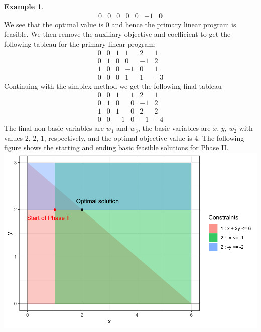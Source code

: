 \documentclass[
]{book}
\theoremstyle{definition}
\theoremstyle{definition}
\newtheorem{example}{Example}[chapter]
\theoremstyle{definition}
\theoremstyle{definition}
\theoremstyle{remark}
\begin{document}
\begin{example}
\begin{equation*}
\begin{array}{rrrrrr|r}
    0 & 0 & 0 & 0 & 0 & -1 & \mathbf{0} 
  \end{array}
\end{equation*}
We see that the optimal value is 0 and hence the primary linear program is feasible. We then remove the auxiliary objective and coefficient to get the following tableau for the primary linear program:
\begin{equation*}
  \begin{array}{rrrrr|r}
    0 & 0 & 1 & \boxed{1} & 2  & 1 \\
    0 & 1 & 0 & 0 & -1 & 2 \\
    1 & 0 & 0 & -1 & 0 & 1 \\ \hline
    0 & 0 & 0 & 1 & 1  & -3
  \end{array}
\end{equation*}
Continuing with the simplex method we get the following final tableau
\begin{equation*}
  \begin{array}{rrrrr|r}
    0 & 0 & 1 & 1 & 2 & 1 \\
    0 & 1 & 0 & 0 & -1 & 2 \\
    1 & 0 & 1 & 0 & 2 & 2 \\ \hline
    0 & 0 & -1 & 0 & -1 & -4 
  \end{array}
\end{equation*}
The final non-basic variables are \(w_1\) and \(w_3\), the basic variables are \(x\), \(y\), \(w_2\) with values \(2\), \(2\), \(1\), respectively, and the optimal objective value is \(4\). The following figure shows the starting and ending basic feasible solutions for Phase II.
\includegraphics{Introduction-to-Optimization_files/figure-latex/fig-auxiliary-lp-1.pdf}
\end{example}
\end{document}
